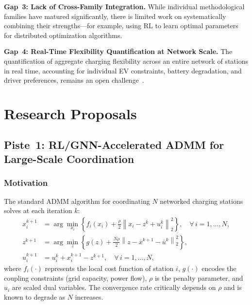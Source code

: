 \documentclass[review]{elsarticle}
\begin{document}
\hspace{0.5cm}\textbf{Gap~3: Lack of Cross-Family Integration.}
While individual methodological families have matured significantly, there is limited work on systematically combining their strengths---for example, using RL to learn optimal parameters for distributed optimization algorithms.

\hspace{0.5cm}\textbf{Gap~4: Real-Time Flexibility Quantification at Network Scale.}
The quantification of aggregate charging flexibility across an entire network of stations in real time, accounting for individual EV constraints, battery degradation, and driver preferences, remains an open challenge~\cite{massaoudi2025analysis,harighi2024flexibility}.


\section{Research Proposals}\label{sec:proposal}



\subsection{Piste~1: RL/GNN-Accelerated ADMM for Large-Scale Coordination}\label{sec:piste1}

\subsubsection{Motivation}

\hspace{0.5cm}The standard ADMM algorithm for coordinating $N$ networked charging stations solves at each iteration $k$:
\begin{align}
    x_i^{k+1} &= \arg\min_{x_i} \left\{ f_i(x_i) + \frac{\rho}{2}\left\| x_i - z^k + u_i^k \right\|_2^2 \right\}, \quad \forall\, i = 1,\ldots,N, \label{eq:admm_x} \\
    z^{k+1} &= \arg\min_z \left\{ g(z) + \frac{N\rho}{2}\left\| z - \bar{x}^{k+1} - \bar{u}^k \right\|_2^2 \right\}, \label{eq:admm_z} \\
    u_i^{k+1} &= u_i^k + x_i^{k+1} - z^{k+1}, \quad \forall\, i = 1,\ldots,N, \label{eq:admm_u}
\end{align}
where $f_i(\cdot)$ represents the local cost function of station $i$, $g(\cdot)$ encodes the coupling constraints (grid capacity, power flow), $\rho$ is the penalty parameter, and $u_i$ are scaled dual variables. The convergence rate critically depends on $\rho$ and is known to degrade as $N$ increases.
\end{document}
